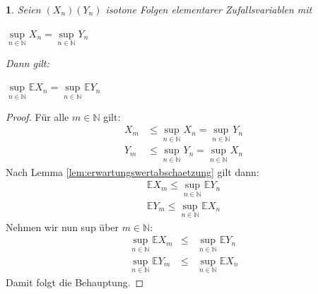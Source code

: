 \documentclass[10pt,a4paper]{report}
\numberwithin{equation}{section}
\numberwithin{figure}{section}
\theoremstyle{plain}
\theoremstyle{definition}
\theoremstyle{remark}
\theoremstyle{plain}
\newtheorem{cor}[thm]{\protect\corollaryname}
\providecommand{\corollaryname}{Korollar}
\newcommand{\1}{ \mathbb{1} } %
\begin{document}
\begin{cor}  %
  Seien $(X_n)(Y_n)$ isotone Folgen elementarer Zufallsvariablen mit
  \begin{center}
    $\sup\limits_{n\in \mathbb{N}} X_n=\sup\limits_{n\in \mathbb{N}}
    Y_n$
  \end{center}
  Dann gilt:
  \begin{center}
    $\sup\limits_{n\in \mathbb{N}}\mathbb{E} X_n=\sup\limits_{n\in
      \mathbb{N}}\mathbb{E} Y_n$
  \end{center}
\end{cor}
\begin{proof}
  Für alle $m\in \mathbb{N}$ gilt:
  \begin{eqnarray*}
    X_m&\leq\sup\limits_{n\in \mathbb{N}} X_n=\sup\limits_{n\in \mathbb{N}} Y_n\\
    Y_m&\leq\sup\limits_{n\in \mathbb{N}} Y_n=\sup\limits_{n\in \mathbb{N}} X_n
  \end{eqnarray*}
  Nach Lemma \ref{lem:erwartungswertabschaetzung} gilt dann:
  \begin{eqnarray*}
    \mathbb{E}X_m\leq \sup\limits_{n\in \mathbb{N}}\mathbb{E} Y_n
  \end{eqnarray*}
  \begin{eqnarray*}
    \mathbb{E}Y_m\leq \sup\limits_{n\in \mathbb{N}}\mathbb{E} X_n
  \end{eqnarray*}
  Nehmen wir nun sup über $m \in \mathbb{N}$:
  \begin{eqnarray*}
    \sup\limits_{n\in \mathbb{N}}\mathbb{E}X_m &\leq &\sup\limits_{n\in \mathbb{N}}\mathbb{E}Y_n\\
    \sup\limits_{n\in \mathbb{N}}\mathbb{E}Y_m &\leq &\sup\limits_{n\in \mathbb{N}}\mathbb{E}X_n
  \end{eqnarray*}
  Damit folgt die Behauptung. 
\end{proof}
\end{document}
